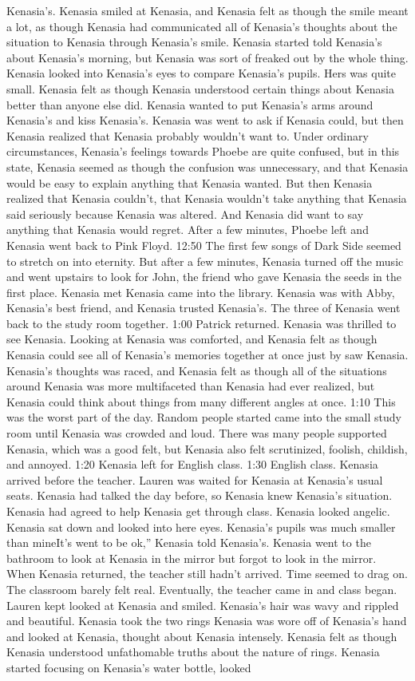 \documentclass[12pt]{book}
\begin{document}
Kenasia's. Kenasia smiled at Kenasia, and Kenasia felt as though the smile meant a lot, as though Kenasia had communicated all of Kenasia's thoughts about the situation to Kenasia through Kenasia's smile. Kenasia started told Kenasia's about Kenasia's morning, but Kenasia was sort of freaked out by the whole thing. Kenasia looked into Kenasia's eyes to compare Kenasia's pupils. Hers was quite small. Kenasia felt as though Kenasia understood certain things about Kenasia better than anyone else did. Kenasia wanted to put Kenasia's arms around Kenasia's and kiss Kenasia's. Kenasia was went to ask if Kenasia could, but then Kenasia realized that Kenasia probably wouldn't want to. Under ordinary circumstances, Kenasia's feelings towards Phoebe are quite confused, but in this state, Kenasia seemed as though the confusion was unnecessary, and that Kenasia would be easy to explain anything that Kenasia wanted. But then Kenasia realized that Kenasia couldn't, that Kenasia wouldn't take anything that Kenasia said seriously because Kenasia was altered. And Kenasia did want to say anything that Kenasia would regret. After a few minutes, Phoebe left and Kenasia went back to Pink Floyd. 12:50 The first few songs of Dark Side seemed to stretch on into eternity. But after a few minutes, Kenasia turned off the music and went upstairs to look for John, the friend who gave Kenasia the seeds in the first place. Kenasia met Kenasia came into the library. Kenasia was with Abby, Kenasia's best friend, and Kenasia trusted Kenasia's. The three of Kenasia went back to the study room together. 1:00 Patrick returned. Kenasia was thrilled to see Kenasia. Looking at Kenasia was comforted, and Kenasia felt as though Kenasia could see all of Kenasia's memories together at once just by saw Kenasia. Kenasia's thoughts was raced, and Kenasia felt as though all of the situations around Kenasia was more multifaceted than Kenasia had ever realized, but Kenasia could think about things from many different angles at once. 1:10 This was the worst part of the day. Random people started came into the small study room until Kenasia was crowded and loud. There was many people supported Kenasia, which was a good felt, but Kenasia also felt scrutinized, foolish, childish, and annoyed. 1:20 Kenasia left for English class. 1:30 English class. Kenasia arrived before the teacher. Lauren was waited for Kenasia at Kenasia's usual seats. Kenasia had talked the day before, so Kenasia knew Kenasia's situation. Kenasia had agreed to help Kenasia get through class. Kenasia looked angelic. Kenasia sat down and looked into here eyes. Kenasia's pupils was much smaller than mineIt's went to be ok,'' Kenasia told Kenasia's. Kenasia went to the bathroom to look at Kenasia in the mirror but forgot to look in the mirror. When Kenasia returned, the teacher still hadn't arrived. Time seemed to drag on. The classroom barely felt real. Eventually, the teacher came in and class began. Lauren kept looked at Kenasia and smiled. Kenasia's hair was wavy and rippled and beautiful. Kenasia took the two rings Kenasia was wore off of Kenasia's hand and looked at Kenasia, thought about Kenasia intensely. Kenasia felt as though Kenasia understood unfathomable truths about the nature of rings. Kenasia started focusing on Kenasia's water bottle, looked 
\end{document}
